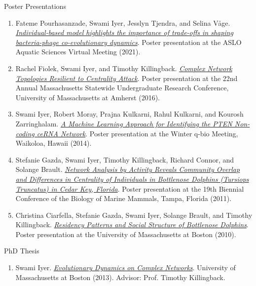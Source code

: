 \documentclass[12pt]{article}
\newenvironment{outerlist}[1][\enskip\textbullet]%
        {\begin{enumerate}[#1]}{\end{enumerate}%
         \vspace{-.6\baselineskip}}
\newcommand{\blankline}{\quad\pagebreak[2]}
\begin{document}
\blankline

Poster Presentations

\begin{outerlist}
\item Fateme Pourhasanzade, Swami Iyer, Jesslyn Tjendra, and Selina V\r{a}ge. \textit{\href{https://www.swamiiyer.net/publications/aslo_poster1.pdf}{Individual-based model highlights the importance of trade-offs in shaping bacteria-phage co-evolutionary dynamics}}. Poster presentation at the ASLO Aquatic Sciences Virtual Meeting (2021).

\item Rachel Fiolek, Swami Iyer, and Timothy Killingback. \textit{\href{http://www.swamiiyer.net/publications/evolving_network_poster.pdf}{Complex Network Topologies Resilient to Centrality Attack}}. Poster presentation at the 22nd Annual Massachusetts Statewide Undergraduate Research Conference, University of Massachusetts at Amherst (2016).

\item Swami Iyer, Robert Moray, Prajna Kulkarni, Rahul Kulkarni, and Kourosh Zarringhalam. \textit{\href{http://www.swamiiyer.net/publications/cerna_poster.pdf}{A Machine Learning Approach for Identifying the PTEN Non-coding ceRNA Network}}. Poster presentation at the Winter q-bio Meeting, Waikoloa, Hawaii (2014).

\item Stefanie Gazda, Swami Iyer, Timothy Killingback, Richard Connor, and Solange Brault. \textit{\href{http://www.swamiiyer.net/publications/dolphins_poster2.pdf}{Network Analysis by Activity Reveals Community Overlap and Differences in Centrality of Individuals in Bottlenose Dolphins (Tursiops Truncatus) in Cedar Key, Florida}}. Poster presentation at the 19th Biennial Conference of the 
Biology of Marine Mammals, Tampa, Florida (2011). 

\item Christina Ciarfella, Stefanie Gazda, Swami Iyer, Solange Brault, and Timothy Killingback. \textit{\href{http://www.swamiiyer.net/publications/dolphins_poster1.pdf}{Residency Patterns and Social Structure of Bottlenose Dolphins}}. Poster presentation at the University of Massachusetts at Boston (2010).
\end{outerlist}

\blankline

PhD Thesis

\begin{outerlist}
\item Swami Iyer. \textit{\href{http://scholarworks.umb.edu/doctoral_dissertations/113}{Evolutionary Dynamics on Complex Networks}}. University of Massachusetts at Boston (2013). Advisor: Prof. Timothy Killingback.
\end{outerlist}
\end{document}
